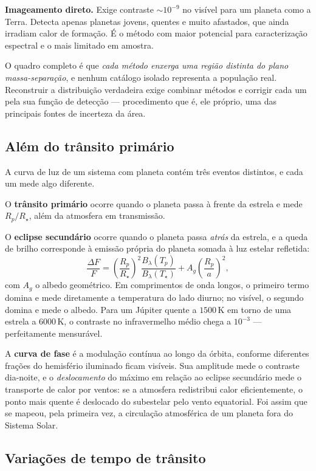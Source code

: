 \documentclass[11pt,a4paper]{article}
\begin{document}
\textbf{Imageamento direto.} Exige contraste $\sim10^{-9}$ no visível para um planeta como a Terra. Detecta apenas planetas jovens, quentes e muito afastados, que ainda irradiam calor de formação. É o método com maior potencial para caracterização espectral e o mais limitado em amostra.

O quadro completo é que \emph{cada método enxerga uma região distinta do plano massa-separação}, e nenhum catálogo isolado representa a população real. Reconstruir a distribuição verdadeira exige combinar métodos e corrigir cada um pela sua função de detecção --- procedimento que é, ele próprio, uma das principais fontes de incerteza da área.

\subsection*{Além do trânsito primário}

A curva de luz de um sistema com planeta contém três eventos distintos, e cada um mede algo diferente.

O \textbf{trânsito primário} ocorre quando o planeta passa à frente da estrela e mede $R_p/R_\star$, além da atmosfera em transmissão.

O \textbf{eclipse secundário} ocorre quando o planeta passa \emph{atrás} da estrela, e a queda de brilho corresponde à emissão própria do planeta somada à luz estelar refletida:
\[
\frac{\Delta F}{F}=\left(\frac{R_p}{R_\star}\right)^{2}\frac{B_\lambda(T_p)}{B_\lambda(T_\star)}+A_g\left(\frac{R_p}{a}\right)^{2},
\]
com $A_g$ o albedo geométrico. Em comprimentos de onda longos, o primeiro termo domina e mede diretamente a temperatura do lado diurno; no visível, o segundo domina e mede o albedo. Para um Júpiter quente a $1500\,\mathrm{K}$ em torno de uma estrela a $6000\,\mathrm{K}$, o contraste no infravermelho médio chega a $10^{-3}$ --- perfeitamente mensurável.

A \textbf{curva de fase} é a modulação contínua ao longo da órbita, conforme diferentes frações do hemisfério iluminado ficam visíveis. Sua amplitude mede o contraste dia-noite, e o \emph{deslocamento} do máximo em relação ao eclipse secundário mede o transporte de calor por ventos: se a atmosfera redistribui calor eficientemente, o ponto mais quente é deslocado do subestelar pelo vento equatorial. Foi assim que se mapeou, pela primeira vez, a circulação atmosférica de um planeta fora do Sistema Solar.

\subsection*{Variações de tempo de trânsito}
\end{document}
